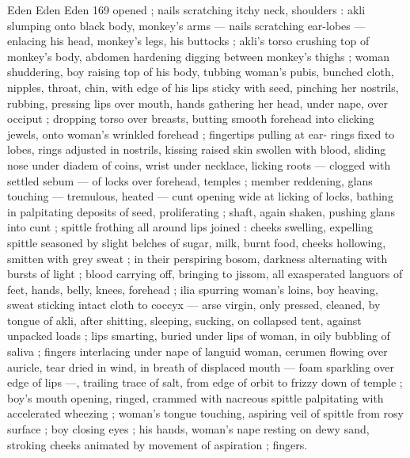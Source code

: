 Eden Eden Eden 169
opened ; nails scratching itchy neck, shoulders : akli slumping onto
black body, monkey's arms — nails scratching ear-lobes — enlacing
his head, monkey's legs, his buttocks ; akli's torso crushing top of
monkey's body, abdomen hardening digging between monkey's
thighs ; woman shuddering, boy raising top of his body, tubbing
woman's pubis, bunched cloth, nipples, throat, chin, with edge of his
lips sticky with seed, pinching her nostrils, rubbing, pressing lips
over mouth, hands gathering her head, under nape, over occiput ;
dropping torso over breasts, butting smooth forehead into clicking
jewels, onto woman's wrinkled forehead ; fingertips pulling at ear-
rings fixed to lobes, rings adjusted in nostrils, kissing raised skin
swollen with blood, sliding nose under diadem of coins, wrist under
necklace, licking roots — clogged with settled sebum — of locks
over forehead, temples ; member reddening, glans touching —
tremulous, heated — cunt opening wide at licking of locks, bathing
in palpitating deposits of seed, proliferating ; shaft, again shaken,
pushing glans into cunt ; spittle frothing all around lips joined :
cheeks swelling, expelling spittle seasoned by slight belches of
sugar, milk, burnt food, cheeks hollowing, smitten with grey sweat ;
in their perspiring bosom, darkness alternating with bursts of light ;
blood carrying off, bringing to jissom, all exasperated languors of
feet, hands, belly, knees, forehead ; ilia spurring woman's loins, boy
heaving, sweat sticking intact cloth to coccyx — arse virgin, only
pressed, cleaned, by tongue of akli, after shitting, sleeping, sucking,
on collapsed tent, against unpacked loads ; lips smarting, buried
under lips of woman, in oily bubbling of saliva ; fingers interlacing
under nape of languid woman, cerumen flowing over auricle, tear
dried in wind, in breath of displaced mouth — foam sparkling over
edge of lips —, trailing trace of salt, from edge of orbit to frizzy
down of temple ; boy’s mouth opening, ringed, crammed with
nacreous spittle palpitating with accelerated wheezing ; woman's
tongue touching, aspiring veil of spittle from rosy surface ; boy
closing eyes ; his hands, woman's nape resting on dewy sand,
stroking cheeks animated by movement of aspiration ; fingers.

